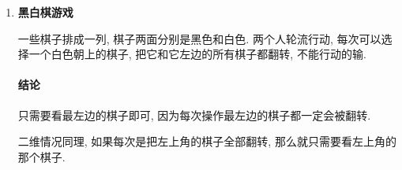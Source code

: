\begin{enumerate}
	\item \textbf{黑白棋游戏}
	
	一些棋子排成一列, 棋子两面分别是黑色和白色. 两个人轮流行动, 每次可以选择一个白色朝上的棋子, 把它和它左边的所有棋子都翻转, 不能行动的输.

	\paragraph{结论}只需要看最左边的棋子即可, 因为每次操作最左边的棋子都一定会被翻转.

	二维情况同理, 如果每次是把左上角的棋子全部翻转, 那么就只需要看左上角的那个棋子.

\end{enumerate}